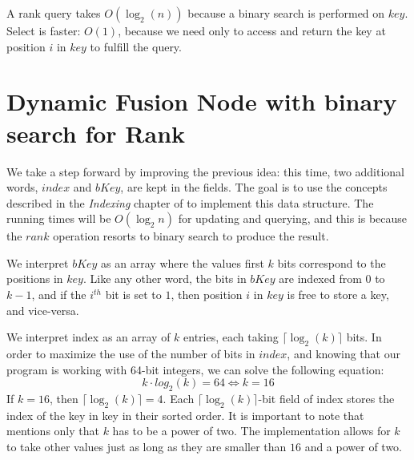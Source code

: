 A rank query takes $O(\log_2(n))$ because a binary search is performed on $key$. Select is faster: $O(1)$, because we need only to access and return the key at position $i$ in $key$ to fulfill the query.

\section{Dynamic Fusion Node with binary search for Rank} \label{sec:DynamicFusionNodeBinaryRank}
We take a step forward by improving the previous idea: this time, two additional words, $index$ and $bKey$, are kept in the fields. The goal is to use the concepts described in the \textit{Indexing} chapter of \cite{patrascu2014dynamic} to implement this data structure. The running times will be $O(\log_2 n)$ for updating and querying, and this is because the $rank$ operation resorts to binary search to produce the result.

We interpret $bKey$ as an array where the values first $k$ bits correspond to the positions in $key$. Like any other word, the bits in $bKey$ are indexed from $0$ to $k-1$, and if the $i^{th}$ bit is set to $1$, then position $i$ in $key$ is free to store a key, and vice-versa.

We interpret {\ttfamily index} as an array of $k$ entries, each taking $\lceil \log_2(k) \rceil$ bits. In order to maximize the use of the number of bits in $index$, and knowing that our program is working with 64-bit integers, we can solve the following equation:
\begin{equation}
    k \cdot log_2(k) = 64 \iff k = 16
\end{equation}
If $k=16$, then $\lceil \log_2(k) \rceil = 4$. Each $\lceil \log_2(k) \rceil$-bit field of {\ttfamily index} stores the index of the key in {\ttfamily key} in their sorted order.
It is important to note that \cite{patrascu2014dynamic} mentions only that $k$ has to be a power of two. The implementation allows for $k$ to take other values just as long as they are smaller than $16$ and a power of two.

